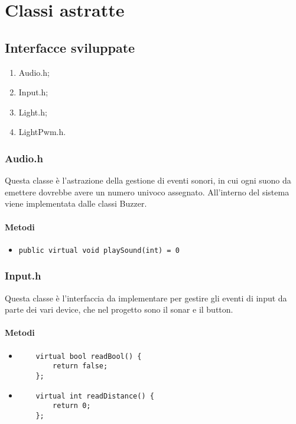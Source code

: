 \chapter{Classi astratte}
\section{Interfacce sviluppate}
\begin{enumerate}
	\item Audio.h;
	\item Input.h;
	\item Light.h;
	\item LightPwm.h.
\end{enumerate}

\subsection{Audio.h}
Questa classe è l'astrazione della gestione di eventi sonori, in cui ogni suono da emettere dovrebbe avere un numero univoco assegnato. All'interno del sistema viene implementata dalle classi Buzzer.
\subsubsection{Metodi}
\begin{itemize}
	\item \texttt{public virtual void playSound(int) = 0}
\end{itemize}

\subsection{Input.h}
Questa classe è l'interfaccia da implementare per gestire gli eventi di input da parte dei vari device, che nel progetto sono il sonar e il button.
\subsubsection{Metodi}
\begin{itemize}
	\item 	\begin{verbatim}
	virtual bool readBool() {
	   	return false;
	};
	\end{verbatim}
	\item 	\begin{verbatim}
	virtual int readDistance() {
	   	return 0;
	};
	\end{verbatim}
\end{itemize}

